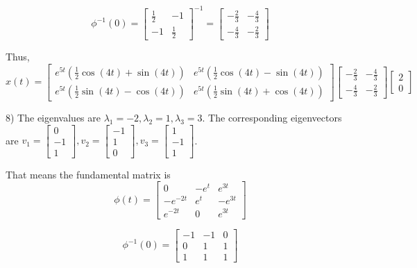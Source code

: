 \documentclass{article}
\begin{document}
\[\phi^{-1}(0) = \begin{bmatrix}
    \frac{1}{2} & -1 \\
    -1 & \frac{1}{2}
\end{bmatrix}^{-1} = \begin{bmatrix}
    -\frac{2}{3} & -\frac{4}{3} \\
    -\frac{4}{3} & -\frac{2}{3}
\end{bmatrix}\]

Thus,
\[x(t) = \begin{bmatrix}
    e^{5t} (\frac{1}{2} \cos(4t) + \sin(4t)) & e^{5t} (\frac{1}{2} \cos(4t) - \sin(4t)) \\
    e^{5t} (\frac{1}{2} \sin(4t) - \cos(4t)) & e^{5t} (\frac{1}{2} \sin(4t) + \cos(4t)) 
\end{bmatrix} \begin{bmatrix}
    -\frac{2}{3} & -\frac{4}{3} \\
    -\frac{4}{3} & -\frac{2}{3}
\end{bmatrix} \begin{bmatrix}
    2 \\
    0
\end{bmatrix}\]

8) The eigenvalues are $\lambda_1 = -2, \lambda_2 = 1, \lambda_3 = 3$.
The corresponding eigenvectors are $v_1 = \begin{bmatrix}
    0 \\
    -1 \\
    1
\end{bmatrix}, v_2 = \begin{bmatrix}
    -1 \\
    1 \\
    0
\end{bmatrix}, v_3 = \begin{bmatrix}
    1 \\
    -1 \\
    1
\end{bmatrix}$.

That means the fundamental matrix is
\[\phi(t) = \begin{bmatrix}
    0 & -e^{t} & e^{3t} \\
    -e^{-2t} & e^t & -e^{3t} \\
    e^{-2t} & 0 & e^{3t}
\end{bmatrix}\]

\[\phi^{-1}(0) = \begin{bmatrix}
    -1 & -1 & 0 \\
    0 & 1 & 1 \\
    1 & 1 & 1
\end{bmatrix}\]
\end{document}
